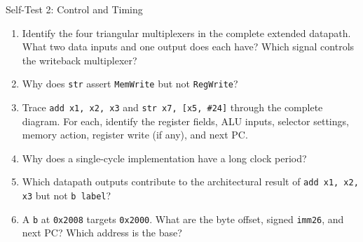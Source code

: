 \documentclass[aspectratio=169,11pt,t]{beamer}
\newcommand{\code}[1]{\texttt{#1}}
\begin{document}
\begin{frame}{Self-Test 2: Control and Timing}
\small
\begin{enumerate}\setlength{\itemsep}{6pt}
  \item Identify the four triangular multiplexers in the complete extended datapath. What two data inputs and one output does each have? Which signal controls the writeback multiplexer?
  \item Why does \code{str} assert \code{MemWrite} but not \code{RegWrite}?
  \item Trace \code{add x1, x2, x3} and \code{str x7, [x5, \#24]} through the complete diagram. For each, identify the register fields, ALU inputs, selector settings, memory action, register write (if any), and next PC.
  \item Why does a single-cycle implementation have a long clock period?
  \item Which datapath outputs contribute to the architectural result of \code{add x1, x2, x3} but not \code{b label}?
  \item A \code{b} at \code{0x2008} targets \code{0x2000}. What are the byte offset, signed \code{imm26}, and next PC? Which address is the base?
\end{enumerate}
\end{frame}
\end{document}
